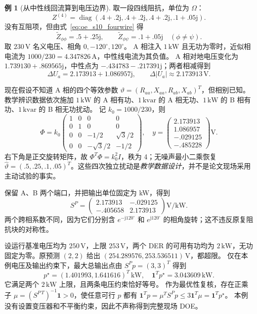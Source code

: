 \documentclass[UTF8,11pt,fontset=fandol,openany,oneside]{ctexbook}
\DeclareMathOperator{\diag}{diag}
\theoremstyle{definition}
\newtheorem{example}[theorem]{例}
\theoremstyle{remark}
\numberwithin{equation}{chapter}
\begin{document}
\begin{example}[从中性线回流算到电压边界]
取一段四线阻抗，单位为 $\Omega$：
\[
 Z^{(4)}=\diag(.4+.2\mathrm j,.4+.2\mathrm j,.4+.2\mathrm j,.1+.05\mathrm j).
\]
没有互阻项，但由式~\eqref{eq:oe_s10_fourwire} 得
\[
 \widetilde Z_{\phi\phi}=.5+.25\mathrm j,\qquad
 \widetilde Z_{\phi\psi}=.1+.05\mathrm j\quad(\phi\ne\psi).
\]
取 $230\,\mathrm V$ 名义电压、相角 $0,-120^\circ,120^\circ$。
A 相注入 $1\,\mathrm{kW}$ 且无功为零时，近似相电流为 $1000/230=4.347826\,\mathrm A$，中性线电流为其负值。
A 相对地电压变化为 $1.739130+.869565\mathrm j$，中性点为
$-.434783-.217391\mathrm j$；两者相减得到
\[
 \Delta U_a=2.173913+1.086957\mathrm j,\qquad
 \Delta|U_a|\approx2.173913\,\mathrm V.
\]

现在假设不知道 A 相的四个等效参数
$\vartheta=(R_{aa},X_{aa},R_{ab},X_{ab})^T$，但相别已知。
教学辨识数据依次施加 $1\,\mathrm{kW}$ 的 A 相有功、$1\,\mathrm{kvar}$ 的 A 相无功、$1\,\mathrm{kW}$ 的 B 相有功、$1\,\mathrm{kvar}$ 的 B 相无功扰动。
记 $k_0=1000/230$，则
\[
 \Phi=k_0\begin{pmatrix}
 1&0&0&0\\0&1&0&0\\0&0&-1/2&\sqrt3/2\\0&0&-\sqrt3/2&-1/2
 \end{pmatrix},\quad
 y=\begin{pmatrix}2.173913\\1.086957\\-.029125\\-.485228\end{pmatrix}\mathrm V.
\]
右下角是正交旋转矩阵，故 $\Phi^T\Phi=k_0^2I$，秩为 4；无噪声最小二乘恢复
$\hat\vartheta=(.5,.25,.1,.05)^T$。这些四次独立扰动是\emph{教学数据设计}，并不是论文现场采用主动试验的事实。

保留 A、B 两个端口，并把输出单位固定为 kW，得到
\[
 S^P=\begin{pmatrix}
 2.173913&-.029125\\-.405658&2.173913
 \end{pmatrix}\mathrm{V/kW}.
\]
两个跨相系数不同，因为它们分别含 $e^{-\mathrm j120^\circ}$ 和
$e^{\mathrm j120^\circ}$ 的相角旋转；这不违反原复阻抗块的对称性。

设运行基准电压均为 $250\,\mathrm V$，上限 $253\,\mathrm V$，两个 DER 的可用有功均为 $2\,\mathrm{kW}$，无功固定为零。原预测 $(2,2)$ 给出
$(254.289576,253.536511)\,\mathrm V$，都超限。
仅在本例电压及输出约束下，最大总输出点由 $S^Pp=(3,3)^T$ 得到
\[
 p^\star=(1.401993,1.641616)^T\,\mathrm{kW},\quad
 \boldsymbol1^Tp^\star=3.043609\,\mathrm{kW}.
\]
它满足两个 $2\,\mathrm{kW}$ 上限，且两条电压约束恰好等号。
作为最优性复核，存在正乘子 $\mu=(S^{P\,T})^{-1}\boldsymbol1>0$，使任意可行 $p$ 都有
$\boldsymbol1^Tp=\mu^TS^Pp\le3\boldsymbol1^T\mu=\boldsymbol1^Tp^\star$。
本例没有设置变压器和不平衡约束，因此不声称得到完整现场 DOE。
\end{example}
\end{document}
